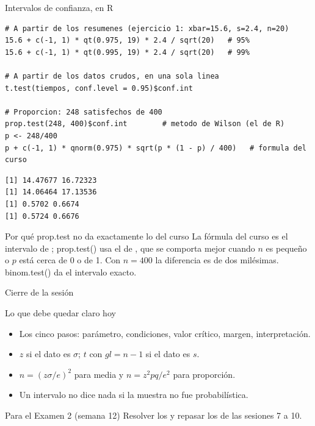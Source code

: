 \documentclass[aspectratio=169,10pt]{beamer}
\newcommand{\fx}[1]{{\ttfamily\color{uniAzul}#1}}
\begin{document}
\begin{frame}[fragile]{Intervalos de confianza, en R}
  \scriptsize
\begin{lstlisting}[style=Rmini]
# A partir de los resumenes (ejercicio 1: xbar=15.6, s=2.4, n=20)
15.6 + c(-1, 1) * qt(0.975, 19) * 2.4 / sqrt(20)   # 95%
15.6 + c(-1, 1) * qt(0.995, 19) * 2.4 / sqrt(20)   # 99%

# A partir de los datos crudos, en una sola linea
t.test(tiempos, conf.level = 0.95)$conf.int

# Proporcion: 248 satisfechos de 400
prop.test(248, 400)$conf.int        # metodo de Wilson (el de R)
p <- 248/400
p + c(-1, 1) * qnorm(0.975) * sqrt(p * (1 - p) / 400)   # formula del curso
\end{lstlisting}
\begin{lstlisting}[style=Rout]
[1] 14.47677 16.72323
[1] 14.06464 17.13536
[1] 0.5702 0.6674
[1] 0.5724 0.6676
\end{lstlisting}

  \vspace{-0.12cm}
  \begin{alertblock}{Por qué \fx{prop.test} no da exactamente lo del curso}
    \tiny
    La fórmula del curso es el intervalo de ; \fx{prop.test()}
    usa el de , que se comporta
    mejor cuando $n$ es pequeño o $p$ está cerca de 0 o de 1. Con $n=400$ la
    diferencia es de dos milésimas. \fx{binom.test()} da el intervalo exacto.
  \end{alertblock}
\end{frame}

\begin{frame}{Cierre de la sesión}
  \begin{block}{Lo que debe quedar claro hoy}
    \begin{itemize}
      \item Los cinco pasos: parámetro, condiciones, valor crítico, margen,
            interpretación.
      \item $z$ si el dato es $\sigma$; $t$ con $gl=n-1$ si el dato es $s$.
      \item $n=(z\sigma/e)^{2}$ para media y $n=z^{2}pq/e^{2}$ para proporción.
      \item Un intervalo no dice nada si la muestra no fue probabilística.
    \end{itemize}
  \end{block}

  \vspace{0.2cm}
  \begin{alertblock}{Para el Examen 2 (semana 12)}
    \footnotesize
    Resolver los  y repasar los
    de las sesiones 7 a 10.
  \end{alertblock}
\end{frame}
\end{document}
